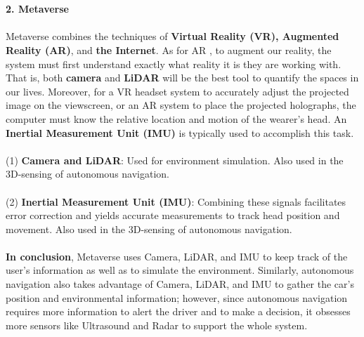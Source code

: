 \\\\
\textbf{2.	Metaverse}
\\\\
Metaverse combines the techniques of \textbf{Virtual Reality (VR), Augmented Reality (AR)}, and \textbf{the Internet}. As for AR \cite{metaverseSensor}, to augment our reality, the system must first understand exactly what reality it is they are working with. That is, both \textbf{camera} and \textbf{LiDAR} will be the best tool to quantify the spaces in our lives. \cite{ARIMU} Moreover, for a VR headset system to accurately adjust the projected image on the viewscreen, or an AR system to place the projected holographs, the computer must know the relative location and motion of the wearer’s head. An \textbf{Inertial Measurement Unit (IMU)} is typically used to accomplish this task.
\\\\
(1)	\textbf{Camera and LiDAR}: Used for environment simulation. Also used in the 3D-sensing of autonomous navigation.
\\\\
(2)	\textbf{Inertial Measurement Unit (IMU)}: Combining these signals facilitates error correction and yields accurate measurements to track head position and movement. Also used in the 3D-sensing of autonomous navigation.
\\\\
\textbf{In conclusion}, Metaverse uses Camera, LiDAR, and IMU to keep track of the user’s information as well as to simulate the environment. Similarly, autonomous navigation also takes advantage of Camera, LiDAR, and IMU to gather the car’s position and environmental information; however, since autonomous navigation requires more information to alert the driver and to make a decision, it obsesses more sensors like Ultrasound and Radar to support the whole system.
